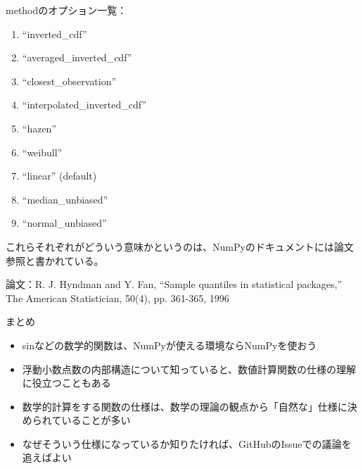 \documentclass[unicode,lualatex,aspectratio=169]{beamer}
\begin{document}
\begin{frame}[fragile]
  methodのオプション一覧：
  {\tiny
  \begin{enumerate}
  \item ``inverted\_cdf''
  \item ``averaged\_inverted\_cdf''
  \item ``closest\_observation''
  \item ``interpolated\_inverted\_cdf''
  \item ``hazen''
  \item ``weibull''
  \item ``linear'' (default)
  \item ``median\_unbiased''
  \item ``normal\_unbiased''
  \end{enumerate}
  }
  これらそれぞれがどういう意味かというのは、NumPyのドキュメントには論文参照と書かれている。

  論文：R. J. Hyndman and Y. Fan, “Sample quantiles in statistical packages,” The American Statistician, 50(4), pp. 361-365, 1996
\end{frame}
\begin{frame}[fragile]{まとめ}
  \begin{itemize}
  \item sinなどの数学的関数は、NumPyが使える環境ならNumPyを使おう
  \item 浮動小数点数の内部構造について知っていると、数値計算関数の仕様の理解に役立つこともある
  \item 数学的計算をする関数の仕様は、数学の理論の観点から「自然な」仕様に決められていることが多い
  \item なぜそういう仕様になっているか知りたければ、GitHubのIssueでの議論を追えばよい
  \end{itemize}
\end{frame}
\end{document}
